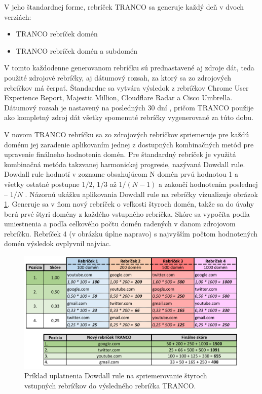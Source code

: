 V jeho štandardnej forme, rebríček TRANCO sa generuje každý deň v dvoch verziách:
\begin{itemize}
    \item TRANCO rebríček domén
    \item TRANCO rebríček domén a subdomén
\end{itemize}

V tomto každodenne generovanom rebríčku sú prednastavené aj zdroje dát, teda použité zdrojové rebríčky, aj dátumový rozsah, za ktorý sa zo zdrojových rebríčkov má čerpať.
Štandardne sa vytvára výsledok z rebríčkov Chrome User Experience Report, Majestic Million, Cloudflare Radar a Cisco Umbrella.
Dátumový rozsah je nastavený na posledných 30 dní \cite{tranco-config}, pričom TRANCO použije ako kompletný zdroj dát všetky spomenuté rebríčky vygenerované za túto dobu. 

V novom TRANCO rebríčku sa zo zdrojových rebríčkov spriemeruje pre každú doménu jej zaradenie aplikovaním jednej z dostupných kombinačných metód pre upravenie finálneho hodnotenia domén.
Pre štandardný rebríček je využitá kombinačná metóda takzvanej harmonickej progresie, nazývaná Dowdall rule. 
Dowdall rule hodnotí v zozname obsahujúcom N domén prvú hodnotou 1 a všetky ostatné postupne \(1/2\), \(1/3\) až \(1/(N-1)\) a zakončí hodnotením poslednej -- \(1/N\) \cite{tranco, tranco-config}.
Názornú ukážku aplikovania Dowdall rule na rebríčky vizualizuje obrázok \ref{img:dowdall-rule}.
Generuje sa v ňom nový rebríček o veľkosti štyroch domén, takže sa do úvahy berú prvé štyri domény z každého vstupného rebríčka. 
Skóre sa vypočíta podľa umiestnenia a podľa celkového počtu domén radených v danom zdrojovom rebríčku. 
Rebríček 4 (v obrázku úplne napravo) s najvyšším počtom hodnotených domén výsledok ovplyvnil najviac.

\begin{figure}[htb]
\begin{center}
 \includegraphics[scale=0.84]{obrazky-figures/dowdall_rule_size_fit_cropped.pdf}
 \caption{Príklad uplatnenia Dowdall rule na spriemerovanie štyroch vstupných rebríčkov do výsledného rebríčka TRANCO.}
 \label{img:dowdall-rule}
\end{center}
\end{figure}

